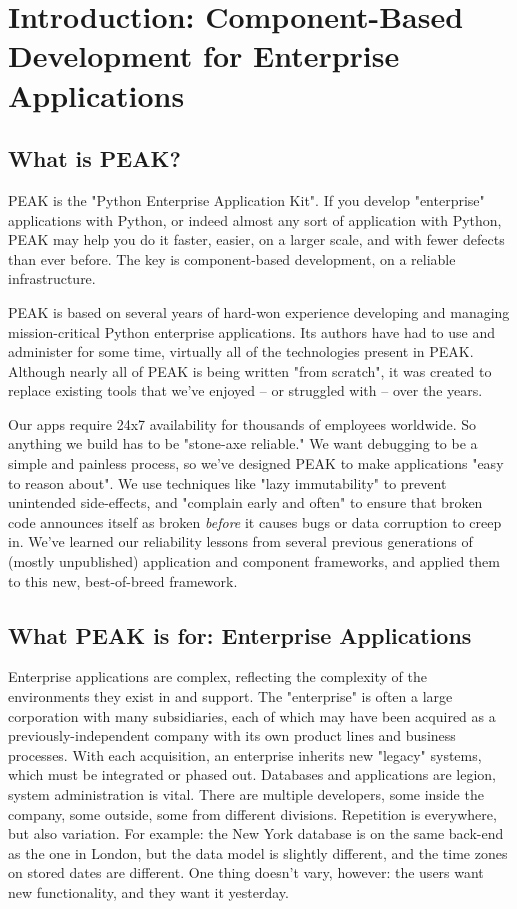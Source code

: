 \chapter{Introduction: Component-Based Development for Enterprise Applications}

\section{What is PEAK?}

PEAK is the "Python Enterprise Application Kit". If you develop
"enterprise" applications with Python, or indeed almost any sort of
application with Python, PEAK may help you do it faster, easier, on a
larger scale, and with fewer defects than ever before. The key is
component-based development, on a reliable infrastructure. 

PEAK is based on several years of hard-won experience developing and
managing mission-critical Python enterprise applications. Its authors
have had to use and administer for some time, virtually all of the
technologies present in PEAK. Although nearly all of PEAK is being
written "from scratch", it was created to replace existing tools that
we've enjoyed -- or struggled with -- over the years. 

Our apps require 24x7 availability for thousands of employees worldwide.
So anything we build has to be "stone-axe reliable." We want debugging
to be a simple and painless process, so we've designed PEAK to make
applications "easy to reason about". We use techniques like "lazy
immutability" to prevent unintended side-effects, and "complain early
and often" to ensure that broken code announces itself as broken
\emph{before} it causes bugs or data corruption to creep in.  We've learned
our reliability lessons from several previous generations of (mostly
unpublished) application and component frameworks, and applied them to
this new, best-of-breed framework. 


\section{What PEAK is for: Enterprise Applications} 

Enterprise applications are complex, reflecting the complexity of the
environments they exist in and support. The "enterprise" is often a
large corporation with many subsidiaries, each of which may have been
acquired as a previously-independent company with its own product lines
and business processes. With each acquisition, an enterprise inherits
new "legacy" systems, which must be integrated or phased out. Databases
and applications are legion, system administration is vital. There are
multiple developers, some inside the company, some outside, some from
different divisions. Repetition is everywhere, but also variation. For
example: the New York database is on the same back-end as the one in
London, but the data model is slightly different, and the time zones on
stored dates are different. One thing doesn't vary, however: the users
want new functionality, and they want it yesterday. 

